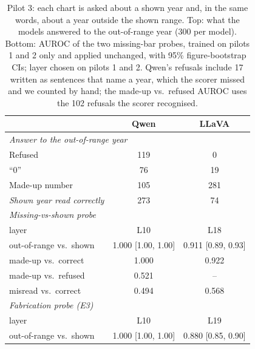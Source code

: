 \begin{table}[t]
\centering\small
\setlength{\tabcolsep}{2pt}
\begin{tabular}{lcc}
\toprule
 & Qwen & LLaVA \\
\midrule
\multicolumn{3}{l}{\textit{Answer to the out-of-range year}} \\
Refused & 119 & 0 \\
``0'' & 76 & 19 \\
Made-up number & 105 & 281 \\
\textit{Shown year read correctly} & 273 & 74 \\
\midrule
\multicolumn{3}{l}{\textit{Missing-vs-shown probe}} \\
\quad layer & L10 & L18 \\
\quad out-of-range vs.\ shown & 1.000 {\scriptsize[1.00, 1.00]} & 0.911 {\scriptsize[0.89, 0.93]} \\
\quad made-up vs.\ correct & 1.000 & 0.922 \\
\quad made-up vs.\ refused & 0.521 & -- \\
\quad misread vs.\ correct & 0.494 & 0.568 \\
\multicolumn{3}{l}{\textit{Fabrication probe (E3)}} \\
\quad layer & L10 & L19 \\
\quad out-of-range vs.\ shown & 1.000 {\scriptsize[1.00, 1.00]} & 0.880 {\scriptsize[0.85, 0.90]} \\
\bottomrule
\end{tabular}
\caption{Pilot 3: each chart is asked about a shown year and, in the same
words, about a year outside the shown range. Top: what the models answered to the
out-of-range year (300 per model). Bottom: AUROC of the two missing-bar probes,
trained on pilots 1 and 2 only and applied unchanged, with 95\% figure-bootstrap
CIs; layer chosen on pilots 1 and 2. Qwen's refusals include 17 written as
sentences that name a year, which the scorer missed and we counted by hand; the
made-up vs.\ refused AUROC uses the 102 refusals the scorer recognised.}
\label{tab:pilot3}
\end{table}
